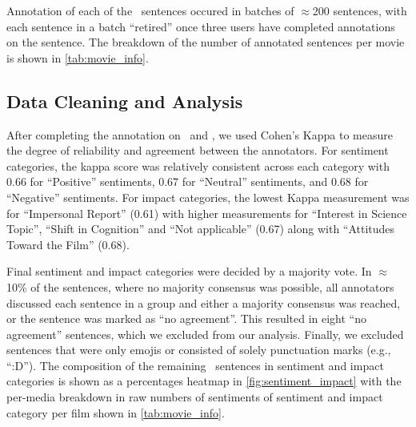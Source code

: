 Annotation of each of the \nsentences\ sentences occured in batches of $\approx$200 sentences, with each sentence in a batch ``retired'' once three users have completed annotations on the sentence.
The breakdown of the number of annotated sentences per movie is shown in \autoref{tab:movie_info}.



\subsection{Data Cleaning and Analysis} \label{sec:datacleaning}
After completing the annotation on \sentiment\ and \impact, we used Cohen's Kappa \citep{cohen1960coefficient} to measure the degree of reliability and agreement between the annotators. For sentiment categories, the kappa score was relatively consistent across each category with 0.66 for ``Positive'' sentiments, 0.67 for ``Neutral'' sentiments, and 0.68 for ``Negative'' sentiments.
For impact categories, the lowest Kappa measurement was for ``Impersonal Report'' (0.61) with higher measurements for ``Interest in Science Topic'', ``Shift in Cognition'' and ``Not applicable'' (0.67) along with ``Attitudes Toward the Film'' (0.68).

Final sentiment and impact categories were decided by a majority vote. In $\approx$10\% of the sentences, where no majority consensus was possible, all annotators discussed each sentence in a group and either a majority consensus was reached, or the sentence was marked as ``no agreement''. This resulted in eight ``no agreement'' sentences, which we excluded from our analysis.
Finally, we excluded sentences that were only emojis or consisted of solely punctuation marks (e.g., ``:D'').
The composition of the remaining \nsentencesNoTBDs\ sentences in sentiment and impact categories is shown as a percentages heatmap in \autoref{fig:sentiment_impact} with the per-media breakdown in raw numbers of sentiments of sentiment and impact category per film shown in \autoref{tab:movie_info}.

